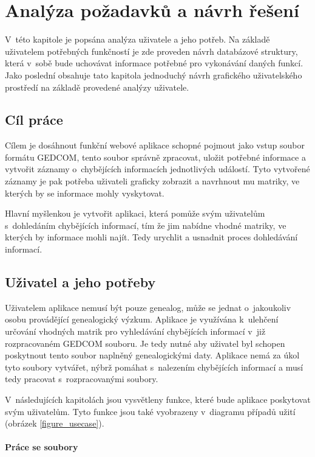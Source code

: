 \chapter{Analýza požadavků a návrh řešení}
\label{požadavky}
V~této kapitole je popsána analýza uživatele a jeho potřeb. Na základě uživatelem potřebných funkčností je zde proveden návrh databázové struktury, která v~sobě bude uchovávat informace potřebné pro vykonávání daných funkcí. Jako poslední obsahuje tato kapitola jednoduchý návrh grafického uživatelského prostředí na základě provedené analýzy uživatele.

\section{Cíl práce}

Cílem je dosáhnout funkční webové aplikace schopné pojmout jako vstup soubor formátu GEDCOM, tento soubor správně zpracovat, uložit potřebné informace a vytvořit záznamy o~chybějících informacích jednotlivých událostí. Tyto vytvořené záznamy je pak potřeba uživateli graficky zobrazit a navrhnout mu matriky, ve kterých by se informace mohly vyskytovat.

Hlavní myšlenkou je vytvořit aplikaci, která pomůže svým uživatelům s~dohledáním chybějících informací, tím že jim nabídne vhodné matriky, ve kterých by informace mohli najít. Tedy urychlit a usnadnit proces dohledávání informací.

\section{Uživatel a jeho potřeby} \label{uživatel_potřeby}

Uživatelem aplikace nemusí být pouze genealog, může se jednat o~jakoukoliv osobu provádějící genealogický výzkum. Aplikace je využívána k~ulehčení určování vhodných matrik pro vyhledávání chybějících informací v~již rozpracovaném GEDCOM souboru. Je tedy nutné aby uživatel byl schopen poskytnout tento soubor naplněný genealogickými daty. Aplikace nemá za úkol tyto soubory vytvářet, nýbrž pomáhat s~nalezením chybějících informací a musí tedy pracovat s~rozpracovanými soubory.

V~následujících kapitolách jsou vysvětleny funkce, které bude aplikace poskytovat svým uživatelům. Tyto funkce jsou také vyobrazeny v~diagramu případů užití (obrázek \ref{figure_usecase}).

\subsubsection{Práce se soubory}

